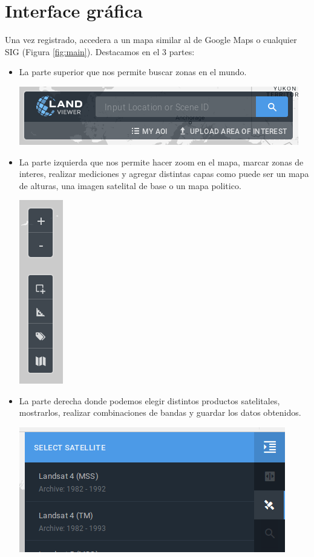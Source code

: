 \documentclass[a4paper,12pt]{book}
\begin{document}
\section{Interface gráfica}

Una vez registrado, accedera a un mapa  similar al de Google Maps o cualquier SIG (Figura \ref{fig:main}). Destacamos en el 3 partes:

\begin{itemize}
    \item La parte superior que nos permite buscar zonas en el mundo.
     \begin{center}\includegraphics[scale=0.4]{in:search.png}\end{center}
    \item La parte izquierda que nos permite hacer zoom en el mapa, marcar zonas de interes, realizar mediciones y agregar distintas capas como puede ser un mapa de alturas, una imagen satelital de base o un mapa politico.
     \begin{center}\includegraphics[scale=0.4]{in:edit.png}\end{center}
    \item La parte derecha donde podemos elegir distintos productos satelitales, mostrarlos, realizar combinaciones de bandas y guardar los datos obtenidos.
     \begin{center}\includegraphics[scale=0.4]{in:sat.png}\end{center}
\end{itemize}
\end{document}
